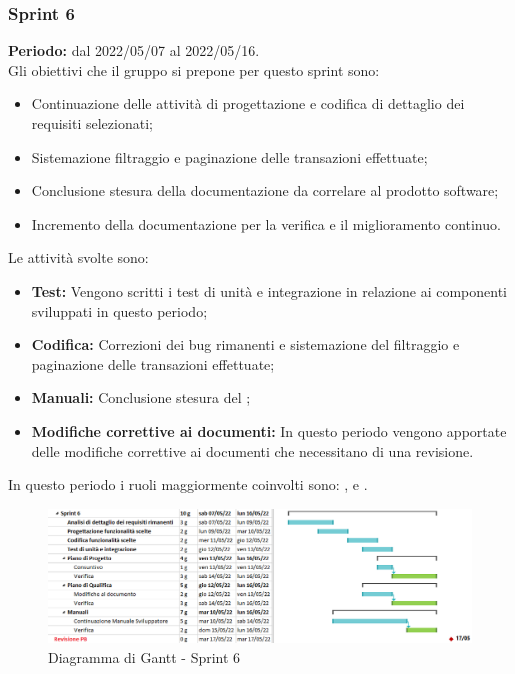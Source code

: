 \subsubsection{Sprint 6} \label{subsubsection:sprint_6}
\textbf{Periodo:} dal 2022/05/07 al 2022/05/16.
\bigskip
\\Gli obiettivi che il gruppo si prepone per questo sprint\glo{} sono:
\begin{itemize}
  \item Continuazione delle attività di progettazione e codifica di dettaglio dei requisiti selezionati;
  \item Sistemazione filtraggio e paginazione delle transazioni effettuate;
  \item Conclusione stesura della documentazione da correlare al prodotto software;
  \item Incremento della documentazione per la verifica e il miglioramento continuo.
\end{itemize}
Le attività svolte sono:
\begin{itemize}
  \item \textbf{Test:} Vengono scritti i test di unità e integrazione in relazione ai componenti sviluppati in questo periodo;
  \item \textbf{Codifica:} Correzioni dei bug\glo{} rimanenti e sistemazione del filtraggio e paginazione delle transazioni effettuate;
  \item \textbf{Manuali:} Conclusione stesura del \docNameVersionMS{};
  \item \textbf{Modifiche correttive ai documenti:} In questo periodo vengono apportate delle modifiche correttive ai documenti che necessitano di una revisione.
\end{itemize}
In questo periodo i ruoli maggiormente coinvolti sono: \roleDesignerLow{}, \roleProgrammerLow{} e \roleVerifierLow{}.
\begin{figure}[H]
  \centering
  \includegraphics[scale=0.55]{immagini/6sprint.png}
  \caption{Diagramma di Gantt - Sprint 6}
\end{figure}
\pagebreak

